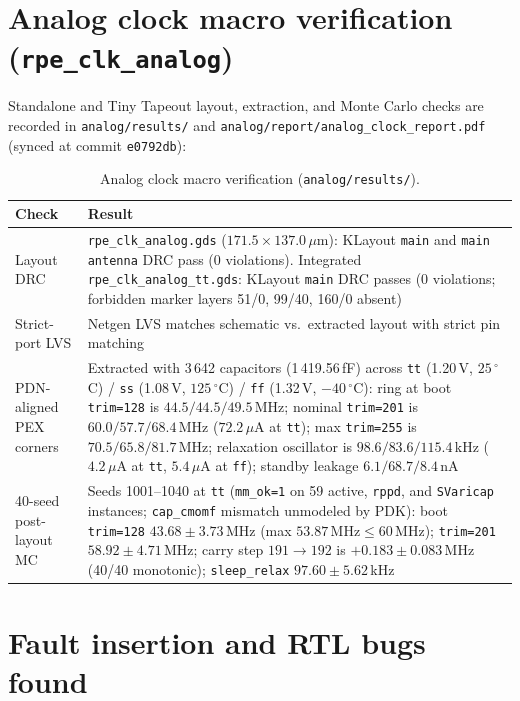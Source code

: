\documentclass[10pt,a4paper]{article}
\begin{document}
\section{Analog clock macro verification (\texttt{rpe\_clk\_analog})}\label{sec:analog}

Standalone and Tiny Tapeout layout, extraction, and Monte Carlo checks are recorded in \texttt{analog/results/} and
\texttt{analog/report/analog\_clock\_report.pdf} (synced at commit \texttt{e0792db}):

\begin{table}[H]
\centering\small
\begin{tabularx}{\linewidth}{@{}lL@{}}
\toprule
Check & Result \\
\midrule
Layout DRC & \texttt{rpe\_clk\_analog.gds} ($171.5 \times 137.0\,\mu$m): KLayout \texttt{main} and \texttt{main antenna} DRC pass (0 violations). Integrated \texttt{rpe\_clk\_analog\_tt.gds}: KLayout \texttt{main} DRC passes (0 violations; forbidden marker layers 51/0, 99/40, 160/0 absent) \\
Strict-port LVS & Netgen LVS matches schematic vs.\ extracted layout with strict pin matching \\
PDN-aligned PEX corners & Extracted with 3\,642 capacitors (1\,419.56\,fF) across \texttt{tt} (1.20\,V, $25\,^\circ$C) / \texttt{ss} (1.08\,V, $125\,^\circ$C) / \texttt{ff} (1.32\,V, $-40\,^\circ$C): ring at boot \texttt{trim=128} is $44.5 / 44.5 / 49.5$\,MHz; nominal \texttt{trim=201} is $60.0 / 57.7 / 68.4$\,MHz ($72.2\,\mu$A at \texttt{tt}); max \texttt{trim=255} is $70.5 / 65.8 / 81.7$\,MHz; relaxation oscillator is $98.6 / 83.6 / 115.4$\,kHz ($4.2\,\mu$A at \texttt{tt}, $5.4\,\mu$A at \texttt{ff}); standby leakage $6.1 / 68.7 / 8.4$\,nA \\
40-seed post-layout MC & Seeds 1001--1040 at \texttt{tt} (\texttt{mm\_ok=1} on 59 active, \texttt{rppd}, and \texttt{SVaricap} instances; \texttt{cap\_cmomf} mismatch unmodeled by PDK): boot \texttt{trim=128} $43.68 \pm 3.73$\,MHz (max $53.87\,\mathrm{MHz} \le 60$\,MHz); \texttt{trim=201} $58.92 \pm 4.71$\,MHz; carry step $191 \to 192$ is $+0.183 \pm 0.083$\,MHz (40/40 monotonic); \texttt{sleep\_relax} $97.60 \pm 5.62$\,kHz \\
\bottomrule
\end{tabularx}
\caption{Analog clock macro verification (\texttt{analog/results/}).}
\end{table}

\section{Fault insertion and RTL bugs found}\label{sec:faults}
\end{document}
